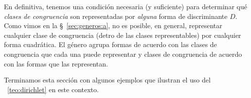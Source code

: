 En definitiva, tenemos una condici\'on necesaria (y suficiente)
para determinar qu\'e \emph{clases de congruencia} son representadas
por \emph{alguna} forma de discriminante $D$.
Como vimos en la \S~\ref{sec:generos:a}, no es posible, en general,
representar cualquier clase de congruencia (detro de las clases
representables) por cualquier forma cuadr\'atica.
El g\'enero agrupa formas de acuerdo con las clases de
congruencia que cada una puede representar y clases de congruencia
de acuerdo con las formas que las representan.

Terminamos esta secci\'on con algunos ejemplos que ilustran
el uso del \teoname~\ref{teo:dirichlet} en este contexto.

